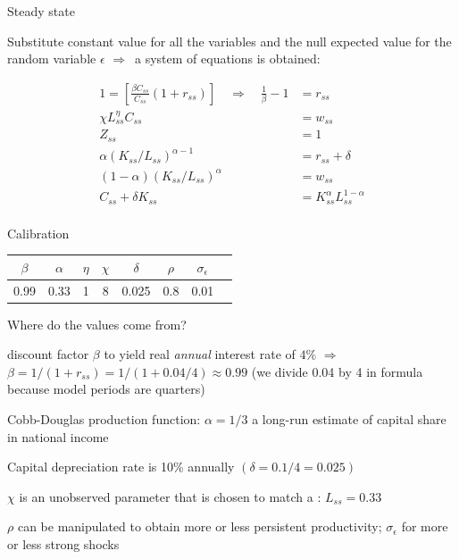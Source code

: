 \documentclass{beamer}
\newcommand{\tb}[1]{{\color{blue}{\textbf{#1}}}}
\newenvironment{mytemize}
{\vfill\itemize[nolistsep,itemsep=\fill,label=\color{blue}{$\triangleright$}]}
  {\enditemize}
\newcommand{\rarr}{$\Rightarrow$\ }
\begin{document}
\begin{frame}{Steady state}

  Substitute constant value for all the variables and the null expected value for the random variable $\epsilon$ \rarr a system of equations is obtained:

\begin{align*}
  1 =  \left[\frac{\beta C_{ss}}{C_{ss}}(1+r_{ss})\right] \quad \Rightarrow \quad \frac{1}{\beta} - 1&= r_{ss}  \\
  \chi L_{ss}^\eta C_{ss} &=w_{ss}  \\
  Z_{ss} &= 1 \\
  \alpha (K_{ss}/L_{ss})^{\alpha-1} &= r_{ss} + \delta \\ 
  (1-\alpha)(K_{ss}/L_{ss})^{\alpha} &= w_{ss} \\
  C_{ss} +\delta K_{ss} &= K_{ss}^\alpha L_{ss}^{1-\alpha}  \\
\end{align*}

\end{frame}
\begin{frame}{Calibration}

\begin{center}

\begin{tabular}{c c c c c c c c}
\toprule
$\beta$ & $\alpha$ & $\eta$ & $\chi$ & $\delta$ & $\rho$ & $\sigma_\epsilon$ \\ 
\hline 
0.99 & 0.33 & 1 & 8 & 0.025 & 0.8 & 0.01 \\ 
\bottomrule
\end{tabular} 
\end{center}
\vfill
Where do the values come from?
\begin{mytemize}
\item discount factor $\beta$ to yield real \textit{annual} interest rate of $4\%$ \rarr $\beta = 1/(1+r_{ss})=1/(1+0.04/4)\approx 0.99$ (we divide 0.04 by 4 in formula because \alert{model periods are quarters})
\item Cobb-Douglas production function: $\alpha=1/3$ a long-run estimate of capital share in national income
\item Capital depreciation rate is 10\% annually $(\delta=0.1/4=0.025)$
\item $\chi$ is an unobserved parameter that is chosen to match a \tb{target}: $L_{ss} = 0.33$ 
\item $\rho$ can be manipulated to obtain more or less persistent productivity; $\sigma_\epsilon$ for more or less strong shocks
\end{mytemize}

\end{frame}
\end{document}
